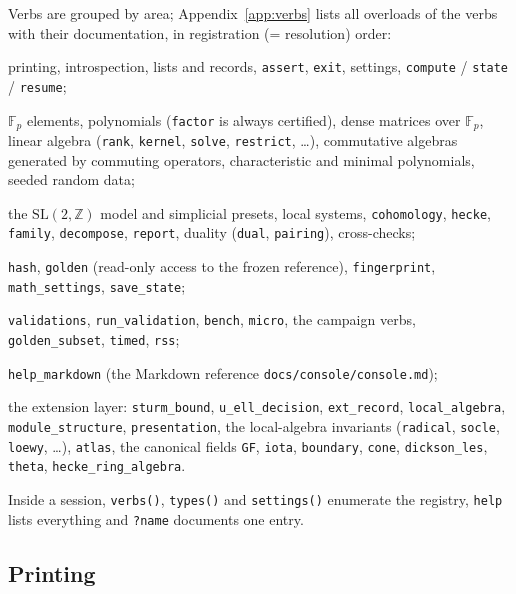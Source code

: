 \documentclass[11pt,openany]{report}
\newcommand{\F}{\mathbb{F}}
\newcommand{\Z}{\mathbb{Z}}
\newcommand{\SL}{\mathrm{SL}}
\newcommand{\file}[1]{\nolinkurl{#1}}
\newcommand{\vb}[1]{\texttt{#1}}
\begin{document}
Verbs are grouped by area; Appendix~\ref{app:verbs} lists all \CMNumOverloads{} overloads of the
\CMNumVerbs{} verbs with their documentation, in registration (= resolution) order:
\begin{description}[nosep,font=\normalfont\ttfamily]
\item[core] printing, introspection, lists and records, \vb{assert}, \vb{exit}, settings, \vb{compute} /
  \vb{state} / \vb{resume};
\item[arithmetic] $\F_p$ elements, polynomials (\vb{factor} is always certified), dense matrices over
  $\F_p$, linear algebra (\vb{rank}, \vb{kernel}, \vb{solve}, \vb{restrict}, \dots), commutative algebras
  generated by commuting operators, characteristic and minimal polynomials, seeded random data;
\item[pipeline] the $\SL(2,\Z)$ model and simplicial presets, local systems, \vb{cohomology}, \vb{hecke},
  \vb{family}, \vb{decompose}, \vb{report}, duality (\vb{dual}, \vb{pairing}), cross-checks;
\item[reproducibility] \vb{hash}, \vb{golden} (read-only access to the frozen reference),
  \vb{fingerprint}, \vb{math\_settings}, \vb{save\_state};
\item[harness] \vb{validations}, \vb{run\_validation}, \vb{bench}, \vb{micro}, the campaign verbs,
  \vb{golden\_subset}, \vb{timed}, \vb{rss};
\item[reference] \vb{help\_markdown} (the Markdown reference \file{docs/console/console.md});
\item[extension] the extension layer: \vb{sturm\_bound}, \vb{u\_ell\_decision}, \vb{ext\_record},
  \vb{local\_algebra}, \vb{module\_structure}, \vb{presentation}, the local-algebra invariants
  (\vb{radical}, \vb{socle}, \vb{loewy}, \dots), \vb{atlas}, the canonical fields \vb{GF}, \vb{iota},
  \vb{boundary}, \vb{cone}, \vb{dickson\_les}, \vb{theta}, \vb{hecke\_ring\_algebra}.
\end{description}
Inside a session, \vb{verbs()}, \vb{types()} and \vb{settings()} enumerate the registry, \texttt{help}
lists everything and \texttt{?name} documents one entry.

\subsection{Printing}\label{sec:printing}
\end{document}
